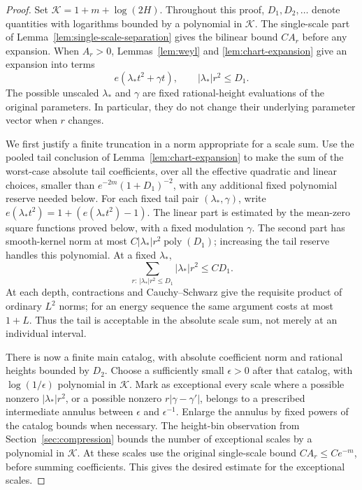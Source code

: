 \begin{proof}
Set
$\mathcal K=1+m+\log(2H)$.  Throughout this proof, $D_1,D_2,\ldots$
denote quantities with logarithms bounded by a polynomial in
$\mathcal K$.  The single-scale part of
Lemma~\ref{lem:single-scale-separation} gives the bilinear bound $CA_r$ before
any expansion.  When $A_r>0$, Lemmas~\ref{lem:weyl} and
\ref{lem:chart-expansion} give an expansion into terms
\[
 e(\lambda_*t^2+\gamma t),\qquad |\lambda_*|r^2\le D_1.
\]
The possible unscaled $\lambda_*$ and $\gamma$ are fixed rational-height
evaluations of the original parameters.  In particular, they do not
change their underlying parameter vector when $r$ changes.

We first justify a finite truncation in a norm appropriate for a scale
sum.  Use the pooled tail conclusion of
Lemma~\ref{lem:chart-expansion} to make the sum of the worst-case absolute
tail coefficients, over all the effective quadratic and linear choices,
smaller than
$e^{-2m}(1+D_1)^{-2}$, with any additional fixed polynomial reserve
needed below.  For each fixed tail pair $(\lambda_*,\gamma)$, write
$e(\lambda_*t^2)=1+(e(\lambda_*t^2)-1)$.  The linear part is estimated
by the mean-zero square functions proved below, with a fixed modulation
$\gamma$.  The second part has smooth-kernel norm at most
$C|\lambda_*|r^2\operatorname{poly}(D_1)$; increasing the tail reserve
handles this polynomial.  At a fixed $\lambda_*$,
\[
 \sum_{r:\,|\lambda_*|r^2\le D_1}|\lambda_*|r^2\le C D_1.
\]
At each depth, contractions and Cauchy--Schwarz give the requisite product
of ordinary $L^2$ norms; for an energy sequence the same argument costs
at most $1+L$.  Thus the tail is acceptable in the absolute scale sum,
not merely at an individual interval.

There is now a finite main catalog, with absolute coefficient norm and
rational heights bounded by $D_2$.  Choose a sufficiently small
$\epsilon>0$ after that catalog, with $\log(1/\epsilon)$ polynomial in
$\mathcal K$.  Mark as exceptional every scale where a possible
nonzero $|\lambda_*|r^2$, or a possible nonzero
$r|\gamma-\gamma'|$, belongs to a prescribed intermediate annulus
between $\epsilon$ and $\epsilon^{-1}$.  Enlarge the annulus by fixed
powers of the catalog bounds when necessary.  The height-bin observation
from Section~\ref{sec:compression} bounds the number of exceptional
scales by a polynomial in $\mathcal K$.  At these scales use the original
single-scale bound $CA_r\le Ce^{-m}$, before summing coefficients.
This gives the desired estimate for the exceptional scales.


\end{proof}
